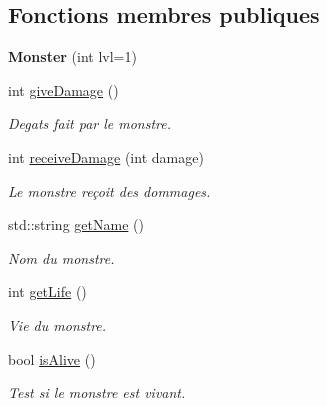 \subsection*{Fonctions membres publiques}
\begin{DoxyCompactItemize}
\item 
\hypertarget{class_monster_a97d2fa38877c507e4c4ff98419d73740}{{\bfseries Monster} (int lvl=1)}\label{class_monster_a97d2fa38877c507e4c4ff98419d73740}

\item 
int \hyperlink{class_monster_a08a5fd3c1bf4667e563005fc33ca9a0a}{give\-Damage} ()
\begin{DoxyCompactList}\small\item\em Degats fait par le monstre. \end{DoxyCompactList}\item 
int \hyperlink{class_monster_a620def2bed48ec0c8fae47746ab87cff}{receive\-Damage} (int damage)
\begin{DoxyCompactList}\small\item\em Le monstre reçoit des dommages. \end{DoxyCompactList}\item 
std\-::string \hyperlink{class_monster_a3f903085b1a1abb9f02c4e1b45aa08f1}{get\-Name} ()
\begin{DoxyCompactList}\small\item\em Nom du monstre. \end{DoxyCompactList}\item 
int \hyperlink{class_monster_a45556268c87162cd9ab2f827fd0ed5df}{get\-Life} ()
\begin{DoxyCompactList}\small\item\em Vie du monstre. \end{DoxyCompactList}\item 
bool \hyperlink{class_monster_aca4e35d1b32aad3e5cf00157bb212956}{is\-Alive} ()
\begin{DoxyCompactList}\small\item\em Test si le monstre est vivant. \end{DoxyCompactList}\end{DoxyCompactItemize}
